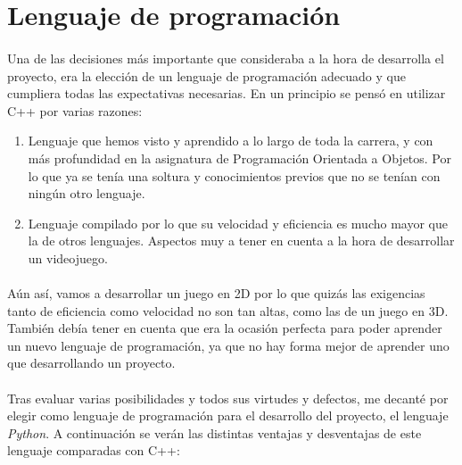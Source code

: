 \section{Lenguaje de programación}

\paragraph{}
Una de las decisiones más importante que consideraba a la hora de desarrolla el proyecto, era la elección de un lenguaje de 
programación adecuado y que cumpliera todas las expectativas necesarias. En un principio se pensó en utilizar C++ por varias 
razones:

\begin{enumerate}
    \item Lenguaje que hemos visto y aprendido a lo largo de toda la carrera, y con más profundidad en la asignatura de 
    Programación Orientada a Objetos. Por lo que ya se tenía una soltura y conocimientos
    previos que no se tenían con ningún otro lenguaje.
    
    \item Lenguaje compilado por lo que su velocidad y eficiencia es mucho mayor que la de otros lenguajes. Aspectos 
    muy a tener en cuenta a la hora de desarrollar un videojuego.
\end{enumerate}

\paragraph{}
Aún así, vamos a desarrollar un juego en 2D por lo que quizás las exigencias tanto de eficiencia como velocidad no son tan altas,
como las de un juego en 3D. También debía tener en cuenta que era la ocasión perfecta para poder aprender un nuevo lenguaje de 
programación, ya que no hay forma mejor de aprender uno que desarrollando un proyecto.

\paragraph{}
Tras evaluar varias posibilidades y todos sus virtudes y defectos, me decanté por elegir como lenguaje de programación para el 
desarrollo del proyecto, el lenguaje \emph{Python}. A continuación se verán las distintas ventajas y desventajas de este lenguaje 
comparadas con C++:


